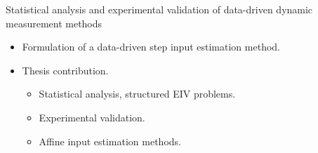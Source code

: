 \documentclass[presentation]{beamer}
\begin{document}
\begin{frame}[label={slides:preview}]{Statistical analysis and experimental validation \linebreak of data-driven dynamic measurement methods}
\begin{itemize}
	\color{gray}
	\item Formulation of a data-driven step input estimation method.
	\vspace{0.5cm}
	\item Thesis contribution.
	\begin{itemize}
 		\color{gray}
 		\item Statistical analysis, structured EIV problems.
		\item Experimental validation.
		\color{black}
		\item Affine input estimation methods.
 	\end{itemize}
\end{itemize}
\color{black}
\end{frame}
\end{document}
